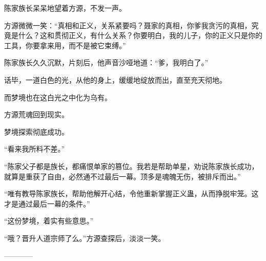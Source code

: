 \begin{this_body}
陈家族长呆呆地望着方源，不发一声。

方源微微一笑：“真相和正义，关系紧要吗？聂家的真相，你爹我贪污的真相，究竟是什么？这和贯彻正义，有什么关系？你要明白，我的儿子，你的正义只是你的工具，你要拿来用，而不是被它束缚。”

陈家族长久久沉默，片刻后，他声音沙哑地道：“爹，我明白了。”

话毕，一道白色的光，从他的身上，缓缓地绽放而出，直至充天彻地。

而梦境也在这白光之中化为乌有。

方源荒魂回到现实。

梦境探索彻底成功。

“看来我所料不差。”

“陈家父子都是族长，都痛恨单家的篡位。我若是帮助单星，劝说陈家族长成功，就算是重获了自由，必然通不过最后一幕。顶多是魂魄无伤，被排斥而出。”

“唯有教导陈家族长，帮助他解开心结，令他重新掌握正义蛊，从而挣脱牢笼。这才是通过最后一幕的条件。”

“这份梦境，着实有些意思。”

“哦？晋升人道宗师了么。”方源查探后，淡淡一笑。

------------

\end{this_body}

